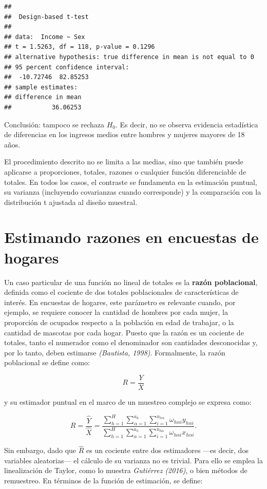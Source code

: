\documentclass[
  spanish,
  12pt,
]{book}
\begin{document}
\begin{verbatim}
## 
##  Design-based t-test
## 
## data:  Income ~ Sex
## t = 1.5263, df = 118, p-value = 0.1296
## alternative hypothesis: true difference in mean is not equal to 0
## 95 percent confidence interval:
##  -10.72746  82.85253
## sample estimates:
## difference in mean 
##           36.06253
\end{verbatim}

Conclusión: tampoco se rechaza \(H_0\). Es decir, no se observa evidencia estadística de diferencias en los ingresos medios entre hombres y mujeres mayores de 18 años.

El procedimiento descrito no se limita a las medias, sino que también puede aplicarse a proporciones, totales, razones o cualquier función diferenciable de totales. En todos los casos, el contraste se fundamenta en la estimación puntual, su varianza (incluyendo covarianzas cuando corresponde) y la comparación con la distribución t ajustada al diseño muestral.

\section{Estimando razones en encuestas de hogares}\label{estimando-razones-en-encuestas-de-hogares}

Un caso particular de una función no lineal de totales es la \textbf{razón poblacional}, definida como el cociente de dos totales poblacionales de características de interés. En encuestas de hogares, este parámetro es relevante cuando, por ejemplo, se requiere conocer la cantidad de hombres por cada mujer, la proporción de ocupados respecto a la población en edad de trabajar, o la cantidad de mascotas por cada hogar. Puesto que la razón es un cociente de totales, tanto el numerador como el denominador son cantidades desconocidas y, por lo tanto, deben estimarse \emph{(Bautista, 1998)}. Formalmente, la razón poblacional se define como:

\[
R = \frac{Y}{X}
\]

y su estimador puntual en el marco de un muestreo complejo se expresa como:

\[
\hat{R} = \frac{\hat{Y}}{\hat{X}}
= \frac{\sum_{h=1}^{H}\sum_{\alpha=1}^{a_{h}}\sum_{i=1}^{n_{h\alpha}}\omega_{h\alpha i} y_{h\alpha i}}
       {\sum_{h=1}^{H}\sum_{\alpha=1}^{a_{h}}\sum_{i=1}^{n_{h\alpha}}\omega_{h\alpha i} x_{h\alpha i}}.
\]

Sin embargo, dado que \(\hat{R}\) es un cociente entre dos estimadores ---es decir, dos variables aleatorias--- el cálculo de su varianza no es trivial. Para ello se emplea la linealización de Taylor, como lo muestra \emph{Gutiérrez (2016)}, o bien métodos de remuestreo. En términos de la función de estimación, se define:
\end{document}
